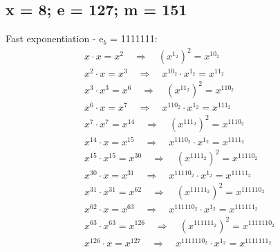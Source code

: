 \subsection{x = 8; e = 127; m = 151}
\label{sec:1b}
Fast exponentiation - e$_{b}$ = 1111111: \\
\begin{equation}
\begin{split}
x \cdot x = x^{2} \quad\Rightarrow\quad (x^{1_{2}})^2 = x^{10_{2}} \\
x^{2} \cdot x = x^{3} \quad\Rightarrow\quad x^{10_{2}} \cdot x^{1_{2}} = x^{11_{2}} \\
x^{3} \cdot x^{3} = x^{6} \quad\Rightarrow\quad (x^{11_{2}})^2 = x^{110_{2}} \\
x^{6} \cdot x = x^{7} \quad\Rightarrow\quad x^{110_{2}} \cdot x^{1_{2}} = x^{111_{2}} \\
x^{7} \cdot x^{7} = x^{14} \quad\Rightarrow\quad (x^{111_{2}})^2 = x^{1110_{2}} \\
x^{14} \cdot x = x^{15} \quad\Rightarrow\quad x^{1110_{2}} \cdot x^{1_{2}} = x^{1111_{2}} \\
x^{15} \cdot x^{15} = x^{30} \quad\Rightarrow\quad (x^{1111_{2}})^2 = x^{11110_{2}} \\
x^{30} \cdot x = x^{31} \quad\Rightarrow\quad x^{11110_{2}} \cdot x^{1_{2}} = x^{11111_{2}} \\
x^{31} \cdot x^{31} = x^{62} \quad\Rightarrow\quad (x^{11111_{2}})^2 = x^{111110_{2}} \\
x^{62} \cdot x = x^{63} \quad\Rightarrow\quad x^{111110_{2}} \cdot x^{1_{2}} = x^{111111_{2}} \\
x^{63} \cdot x^{63} = x^{126} \quad\Rightarrow\quad (x^{111111_{2}})^2 = x^{1111110_{2}} \\
x^{126} \cdot x = x^{127} \quad\Rightarrow\quad x^{1111110_{2}} \cdot x^{1_{2}} = x^{1111111_{2}} 
\end{split}
\end{equation}

